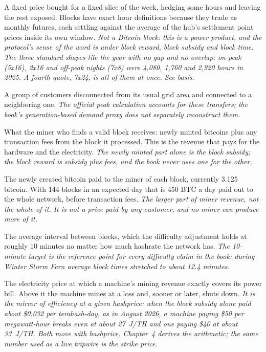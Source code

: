 \begin{description}[leftmargin=0pt,style=unboxed,itemsep=0.35em,parsep=0.15em]
\item[block] \hypertarget{glossary:block}{}A fixed price bought for a fixed slice of the week, hedging some hours and leaving the rest exposed. Blocks have exact hour definitions because they trade as monthly futures, each settling against the average of the hub's settlement point prices inside its own window. \emph{Not a Bitcoin block: this is a power product, and the protocol's sense of the word is under block reward, block subsidy and block time. The three standard shapes tile the year with no gap and no overlap: on-peak (5x16), 2x16 and off-peak nights (7x8) were 4,080, 1,760 and 2,920 hours in 2025. A fourth quote, 7x24, is all of them at once. See basis.}
\item[Block Load Transfer (BLT)] \hypertarget{glossary:block-load-transfer}{}A group of customers disconnected from its usual grid area and connected to a neighboring one. \emph{The official peak calculation accounts for these transfers; the book's generation-based demand proxy does not separately reconstruct them.}
\item[block reward] \hypertarget{glossary:block-reward}{}What the miner who finds a valid block receives: newly minted bitcoins plus any transaction fees from the block it processed. This is the revenue that pays for the hardware and the electricity. \emph{The newly minted part alone is the block subsidy; the block reward is subsidy plus fees, and the book never uses one for the other.}
\item[block subsidy] \hypertarget{glossary:block-subsidy}{}The newly created bitcoin paid to the miner of each block, currently 3.125 bitcoin. With 144 blocks in an expected day that is 450 BTC a day paid out to the whole network, before transaction fees. \emph{The larger part of miner revenue, not the whole of it. It is not a price paid by any customer, and no miner can produce more of it.}
\item[block time] \hypertarget{glossary:block-time}{}The average interval between blocks, which the difficulty adjustment holds at roughly 10 minutes no matter how much hashrate the network has. \emph{The 10-minute target is the reference point for every difficulty claim in the book: during Winter Storm Fern average block times stretched to about 12.4 minutes.}
\item[breakeven price] \hypertarget{glossary:breakeven-price}{}The electricity price at which a machine's mining revenue exactly covers its power bill. Above it the machine mines at a loss and, sooner or later, shuts down. \emph{It is the mirror of efficiency at a given hashprice: when the block subsidy alone paid about \$0.032 per terahash-day, as in August 2026, a machine paying \$50 per megawatt-hour breaks even at about 27~J/TH and one paying \$40 at about 33~J/TH. Both move with hashprice. Chapter~4 derives the arithmetic; the same number used as a live tripwire is the strike price.}

\end{description}
